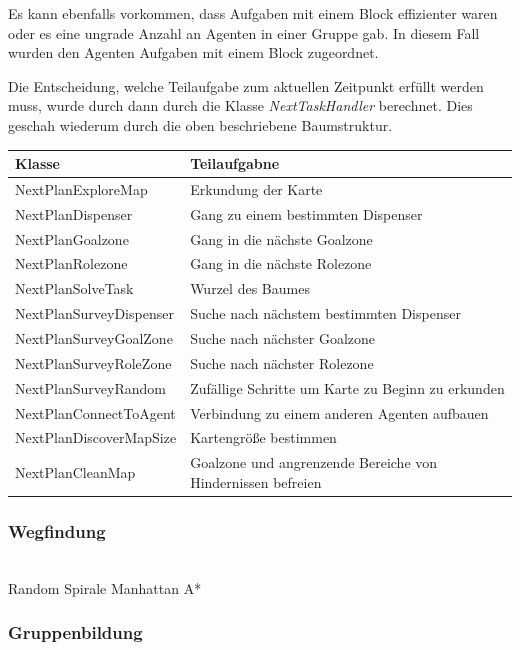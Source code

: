 Es kann ebenfalls vorkommen, dass Aufgaben mit einem Block effizienter waren oder es eine ungrade Anzahl an Agenten in einer Gruppe gab. In diesem Fall wurden den Agenten Aufgaben mit einem Block zugeordnet.

Die Entscheidung, welche Teilaufgabe zum aktuellen Zeitpunkt erfüllt werden muss, wurde durch dann durch die Klasse \textit{NextTaskHandler} berechnet. Dies geschah wiederum durch die oben beschriebene Baumstruktur. \\

\begin{tabular}{l | p{6cm}}\label{Liste der Pläne}
Klasse & Teilaufgabne \\
\hline
NextPlanExploreMap & Erkundung der Karte\\
NextPlanDispenser & Gang zu einem bestimmten Dispenser\\
NextPlanGoalzone & Gang in die nächste Goalzone\\
NextPlanRolezone & Gang in die nächste Rolezone\\
NextPlanSolveTask & Wurzel des Baumes\\
NextPlanSurveyDispenser & Suche nach nächstem bestimmten Dispenser\\
NextPlanSurveyGoalZone & Suche nach nächster Goalzone\\
NextPlanSurveyRoleZone & Suche nach nächster Rolezone\\
NextPlanSurveyRandom & Zufällige Schritte um Karte zu Beginn zu erkunden\\
NextPlanConnectToAgent & Verbindung zu einem anderen Agenten aufbauen\\
NextPlanDiscoverMapSize & Kartengröße bestimmen\\
NextPlanCleanMap & Goalzone und angrenzende Bereiche von Hindernissen befreien\\
\end{tabular}

\subsubsection{Wegfindung} \label{kap:wegfindung} ~\\
Random \newline
Spirale \newline
Manhattan \newline
A*

\subsubsection{Gruppenbildung} \label{kap:Gruppenbildung} ~\\

